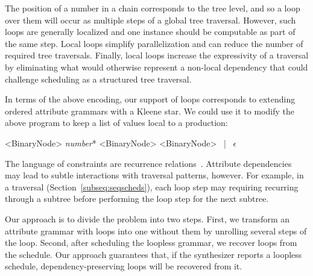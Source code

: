 The position of a number in a  chain corresponds to the tree level, and so a loop over them will occur as multiple steps of a global tree traversal. However, such loops are generally localized and one instance should be computable as part of the same step. Local loops simplify parallelization and can reduce the number of required tree traversals. Finally, local loops increase the expressivity of a traversal by eliminating what would otherwise represent a non-local dependency that could challenge scheduling as a structured tree traversal. 

In terms of the above encoding, our support of loops corresponds to extending ordered attribute grammars with a Kleene star. We could use it to modify the above program to keep a list of values local to a production:

\begin{minipage}{1\columnwidth}
\renewcommand{\litleft}{\bfseries}
\renewcommand{\ulitleft}{\bfseries}
\renewcommand{\superscript}[1]{\ensuremath{^{\textrm{#1}}}}
\renewcommand{\subscript}[1]{\ensuremath{_{\textrm{\uppercase{#1}}}}}
\renewcommand{\syntleft}{\normalfont\itshape\texttt{<}}
\renewcommand{\syntright}{\texttt{>}}
\begin{grammar}
<BinaryNode> \deriv{} \emph{number}* <BinaryNode> <BinaryNode> ~|~ $\epsilon$
\end{grammar}
\end{minipage}

The language of constraints are recurrence relations~\cite{??}. Attribute dependencies may lead to subtle interactions with traversal patterns, however. For example, in a  traversal (Section~\ref{subseq:seqscheds}), each loop step may requiring recurring through a subtree before performing the loop step for the next subtree.

Our approach is to divide the problem into two steps. First, we transform an attribute grammar with loops into one without them by unrolling several steps of the loop. Second, after scheduling the loopless grammar, we recover loops from the schedule. Our approach guarantees that, if the synthesizer reports a loopless schedule, dependency-preserving loops will be recovered from it.


